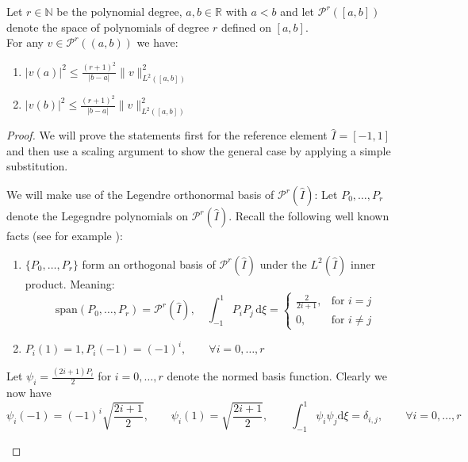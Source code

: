 \begin{lemma}
    \label{lemma:inv_ineq}
    Let $r\in \mathbb{N}$ be the polynomial degree, 
    $a,b\in \mathbb{R}$ with $a<b$ and let $\mathcal{P}^r([a,b])$ denote the 
    space of polynomials of degree $r$ defined on $[a,b]$. \\
    For any $v\in \mathcal{P}^r((a,b))$ we have:
    \begin{enumerate}
        \item $\displaystyle |v(a)|^2 \leq \frac{{(r+1)}^2}{|b-a|}\|v\|_{L^2([a,b])}^2$ 
        \item $\displaystyle |v(b)|^2 \leq \frac{{(r+1)}^2}{|b-a|}\|v\|_{L^2([a,b])}^2$
    \end{enumerate}
\end{lemma}
\begin{proof}
    We will prove the statements first for the reference element $\hat{I} = [-1,1]$ and then
    use a scaling argument to show the general case by applying a simple substitution. \\
    \begin{proofstep}[Setup]
        We will make 
        use of the Legendre orthonormal basis of $\mathcal{P}^r(\hat{I})$:
        Let $P_0,\ldots,P_r$ denote the Legegndre polynomials on  $\mathcal{P}^r(\hat{I})$. 
        Recall the following well known facts (see for example \cite{quarteroniNumericalMathematicSpringer2007}): 
        \begin{enumerate}
            \item $\{P_0,\ldots,P_r\}$ form an orthogonal basis of $\mathcal{P}^r(\hat{I})$ under the
            $L^2(\hat{I})$ inner product. Meaning:
            \[
            \text{span}(P_0,\ldots,P_r) = \mathcal{P}^r(\hat{I}),\quad \int_{-1}^{1} P_i P_j \,\text{d}\xi = 
            \begin{cases}
                \frac{2}{2i + 1}, &\text{for } i=j \\
                0, &\text{for } i\neq j   
            \end{cases} 
            \]    
            \item $P_i(1) = 1, P_i(-1) = {(-1)}^i, \qquad \forall i = 0,\ldots,r$
        \end{enumerate}
        Let $\psi_i = \frac{(2i + 1)P_i}{2}$ for $i=0,\ldots,r$ denote the normed 
        basis function. Clearly we now have 
        \[
            \psi_i(-1) = {(-1)}^i\sqrt{\frac{2i+1}{2}}, \qquad \psi_i(1) = \sqrt{\frac{2i+1}{2}}, 
            \qquad \int_{-1}^{1}\psi_i \psi_j \text{d}\xi = \delta_{i,j}, \qquad \forall i = 0,\ldots,r
\]
\end{proofstep}
\end{proof}
